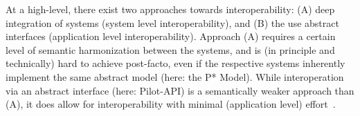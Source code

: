 \documentclass{sig-alternate}
\begin{document}
%
%
% 
% 

At a high-level, there exist two approaches towards interoperability:
(A) deep integration of systems (system level interoperability), and
(B) the use abstract interfaces (application level interoperability).
Approach (A) requires a certain level of semantic harmonization
between the systems, and is (in principle and technically) hard to
achieve post-facto, even if the respective systems inherently
implement the same abstract model (here: the P* Model).  While
interoperation via an abstract interface (here: Pilot-API) is a
semantically weaker approach than (A), it does allow for
interoperability with minimal (application level)
effort~\cite{saga_bigjob_condor_cloud,saga_gin}.


\end{document}
